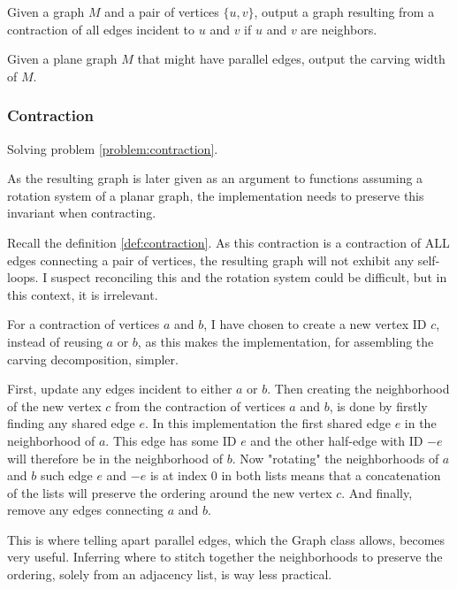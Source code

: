 \documentclass{article}
\begin{document}
		\begin{problem}\label{problem:contraction}
			Given a graph $M$ and a pair of vertices $\{u, v\}$, output a graph resulting from a contraction of all edges incident to $u$ and $v$ if $u$ and $v$ are neighbors.
		\end{problem}

		\begin{problem}\label{problem:cw}
			Given a plane graph $M$ that might have parallel edges, output the carving width of $M$.
		\end{problem}

		\subsubsection{Contraction}

			Solving problem \ref{problem:contraction}.

			As the resulting graph is later given as an argument to functions assuming a rotation system of a planar graph, the implementation needs to preserve this invariant when contracting.

			Recall the definition \ref{def:contraction}. As this contraction is a contraction of ALL edges connecting a pair of vertices, the resulting graph will not exhibit any self-loops. I suspect reconciling this and the rotation system could be difficult, but in this context, it is irrelevant.

			For a contraction of vertices $a$ and $b$, I have chosen to create a new vertex ID $c$, instead of reusing $a$ or $b$, as this makes the implementation, for assembling the carving decomposition, simpler.

			First, update any edges incident to either $a$ or $b$. Then creating the neighborhood of the new vertex $c$ from the contraction of vertices $a$ and $b$, is done by firstly finding any shared edge $e$. In this implementation the first shared edge $e$ in the neighborhood of $a$. This edge has some ID $e$ and the other half-edge with ID $-e$ will therefore be in the neighborhood of $b$. Now  "rotating" the neighborhoods of $a$ and $b$ such edge $e$ and $-e$ is at index 0 in both lists means that a concatenation of the lists will preserve the ordering around the new vertex $c$. And finally, remove any edges connecting $a$ and $b$.
			
			This is where telling apart parallel edges, which the Graph class allows, becomes very useful. Inferring where to stitch together the neighborhoods to preserve the ordering, solely from an adjacency list, is way less practical.
\end{document}
